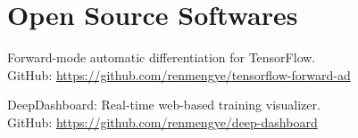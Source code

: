 \if{}
\section{\sc Open Source Softwares}
\begin{list2}
\if{}
\fi
\item Forward-mode automatic differentiation for TensorFlow. \\
GitHub: \url{https://github.com/renmengye/tensorflow-forward-ad}
\item DeepDashboard: Real-time web-based training visualizer.\\
GitHub: \url{https://github.com/renmengye/deep-dashboard}
\end{list2}
\vspace{0.1in}
\fi